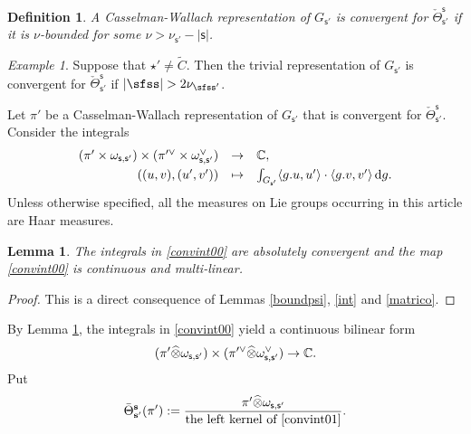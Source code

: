 \documentclass[12pt,a4paper]{amsart}
\def\abs#1{\left|{#1}\right|}
\newcommand{\od}{\operatorname{d}}
\newcommand{\la}{\langle}
\newcommand{\ra}{\rangle}
\newcommand{\be}{\begin {equation}}
\newcommand{\ee}{\end {equation}}
\numberwithin{equation}{section}
\newtheorem{lem}[thm]{Lemma}
\newtheorem{defn}[thm]{Definition}
\theoremstyle{remark}
\newtheorem*{Example}{Example}
\def\Thetab{\bar{\Theta}}
\begin{document}
 \begin{defn}\label{defn:CRcov}
A Casselman-Wallach representation of $G_{\mathsf s'}$ is convergent for $\check \Theta_{\mathsf s'}^{\mathsf s}$ 
if it is $\nu$-bounded for some $\nu>\nu_{\mathsf s'}-\abs{\mathsf s}$. 
\end{defn}


\begin{Example}
Suppose that $\star'\neq \widetilde C$. Then the trivial representation of $G_{\mathsf s'}$ is convergent for $\check \Theta_{\mathsf s'}^{\mathsf s}$ if $\abs{\sfss}>2\nu_{\sfss'}$. 

\end{Example}
Let $\pi'$ be a  Casselman-Wallach representation of $G_{\mathsf s'}$ that is convergent for $\check \Theta_{\mathsf s'}^{\mathsf s}$. 
Consider the integrals
\be\label{convint00}
\begin{array}{rcl}
 (\pi' \times \omega_{\mathsf s, \mathsf s'})\times (\pi'^\vee \times \omega_{\mathsf s, \mathsf s'}^\vee )&\rightarrow &\C, \smallskip \\
   ((u,v),(u',v')) &\mapsto &\int_{G_{\mathsf s'}} \la g.u, u'\ra\cdot \la g.v, v'\ra \od\! g.
   \end{array}
 \ee
Unless otherwise specified, all the measures on Lie groups occurring  in this article are  Haar measures. 

\begin{lem}\label{lemconv}
The integrals in \eqref{convint00} are absolutely convergent and the map \eqref{convint00} is   continuous and multi-linear. 
\end{lem}
\begin{proof}
This is a direct consequence of Lemmas \ref{boundpsi}, \ref{int} and \ref{matrico}. 
\end{proof}

By Lemma \ref{lemconv}, the integrals in \eqref{convint00} yield a continuous bilinear form
\be\label{convint01}
 (\pi' \widehat \otimes \omega_{\mathsf s, \mathsf s'})\times (\pi'^\vee \widehat \otimes \omega_{\mathsf s, \mathsf s'}^\vee )\rightarrow \C.
 \ee
Put
\begin{equation}\label{thetab0}
  \Thetab_{\mathbf s'}^{\mathbf s}(\pi'):=\frac{\pi' \widehat \otimes \omega_{\mathsf s, \mathsf s'}}{\textrm{the left kernel of \eqref{convint01}}}.
\end{equation}
\end{document}
